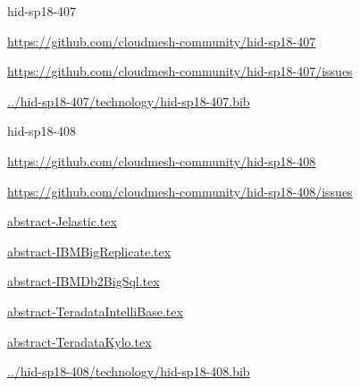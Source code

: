 \begin{IU}

hid-sp18-407

\url{https://github.com/cloudmesh-community/hid-sp18-407}

\url{https://github.com/cloudmesh-community/hid-sp18-407/issues}

\href{https://github.com/cloudmesh-community/hid-sp18-407/blob/master//technology/hid-sp18-407.bib}{../hid-sp18-407/technology/hid-sp18-407.bib}

\end{IU}


\begin{IU}

hid-sp18-408

\url{https://github.com/cloudmesh-community/hid-sp18-408}

\url{https://github.com/cloudmesh-community/hid-sp18-408/issues}

\href{https://github.com/cloudmesh-community/hid-sp18-408/blob/master//technology/abstract-Jelastic.tex}{abstract-Jelastic.tex}

\href{https://github.com/cloudmesh-community/hid-sp18-408/blob/master//technology/abstract-IBMBigReplicate.tex}{abstract-IBMBigReplicate.tex}

\href{https://github.com/cloudmesh-community/hid-sp18-408/blob/master//technology/abstract-IBMDb2BigSql.tex}{abstract-IBMDb2BigSql.tex}

\href{https://github.com/cloudmesh-community/hid-sp18-408/blob/master//technology/abstract-TeradataIntelliBase.tex}{abstract-TeradataIntelliBase.tex}

\href{https://github.com/cloudmesh-community/hid-sp18-408/blob/master//technology/abstract-TeradataKylo.tex}{abstract-TeradataKylo.tex}

\href{https://github.com/cloudmesh-community/hid-sp18-408/blob/master//technology/hid-sp18-408.bib}{../hid-sp18-408/technology/hid-sp18-408.bib}

\end{IU}


